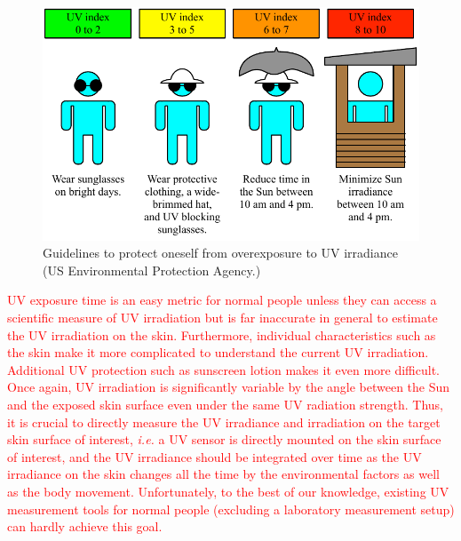 \documentclass[journal]{IEEEtran}
\begin{document}
\begin{figure}
\centering
\includegraphics[width=1.0\hsize]{Figures/UVI_guideline.pdf}
\caption{Guidelines to protect oneself from overexposure to UV irradiance (US Environmental Protection Agency.)}
\label{fig:guidelines}
\end{figure}
\textcolor{red}{UV exposure time is an easy metric for normal people unless they can access a scientific measure of UV irradiation but is far inaccurate in general to estimate the UV irradiation on the skin. Furthermore, individual characteristics such as the skin make it more complicated to understand the current UV irradiation. 
Additional UV protection such as sunscreen lotion makes it even more difficult. 
Once again, UV irradiation is significantly variable by the angle between the Sun and the exposed skin surface even under the same UV radiation strength. Thus, it is crucial to directly measure the UV irradiance and irradiation on the target skin surface of interest, \textit{i.e.} a UV sensor is directly mounted on the skin surface of interest, and the UV irradiance should be integrated over time as the UV irradiance on the skin changes all the time by the environmental factors as well as the body movement. Unfortunately, to the best of our knowledge, existing UV measurement tools for normal people (excluding a laboratory measurement setup) can hardly achieve this goal.}
\end{document}
